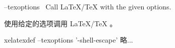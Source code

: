 \begin{docKey}
{--texoptions}{~}%
{}%
Call \LaTeX/\TeX{} with the given options.

使用给定的选项调用 \LaTeX/\TeX{} 。

\begin{commandshell}
xelatexdef --texoptions '-shell-escape' 略...
\end{commandshell}
\end{docKey}